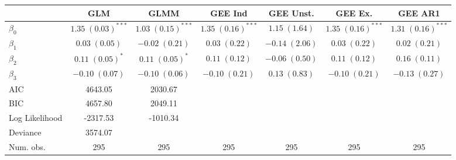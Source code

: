 \documentclass[11pt,letter]{article}\usepackage[]{graphicx}\usepackage[]{color}
\begin{document}
\begin{table}[H]
\begin{center}
\begin{scriptsize}
\begin{tabular}{l c c c c c c }
\hline
 & GLM & GLMM & GEE Ind & GEE Unst. & GEE Ex. & GEE AR1 \\
\hline
$\beta_0$                & $\mathbf{1.35} \; (0.03)^{***}$ & $\mathbf{1.03} \; (0.15)^{***}$ & $\mathbf{1.35} \; (0.16)^{***}$ & $1.15 \; (1.64)$  & $\mathbf{1.35} \; (0.16)^{***}$ & $\mathbf{1.31} \; (0.16)^{***}$ \\
$\beta_1$                & $0.03 \; (0.05)$                & $-0.02 \; (0.21)$               & $0.03 \; (0.22)$                & $-0.14 \; (2.06)$ & $0.03 \; (0.22)$                & $0.02 \; (0.21)$                \\
$\beta_2$                & $\mathbf{0.11} \; (0.05)^{*}$   & $\mathbf{0.11} \; (0.05)^{*}$   & $0.11 \; (0.12)$                & $-0.06 \; (0.50)$ & $0.11 \; (0.12)$                & $0.16 \; (0.11)$                \\
$\beta_3$                & $-0.10 \; (0.07)$               & $-0.10 \; (0.06)$               & $-0.10 \; (0.21)$               & $0.13 \; (0.83)$  & $-0.10 \; (0.21)$               & $-0.13 \; (0.27)$               \\
\hline
AIC                      & 4643.05                         & 2030.67                         &                                 &                   &                                 &                                 \\
BIC                      & 4657.80                         & 2049.11                         &                                 &                   &                                 &                                 \\
Log Likelihood           & -2317.53                        & -1010.34                        &                                 &                   &                                 &                                 \\
Deviance                 & 3574.07                         &                                 &                                 &                   &                                 &                                 \\
Num. obs.                & 295                             & 295                             & 295                             & 295               & 295                             & 295                             \\

\end{tabular}
\end{scriptsize}
\end{center}
\end{table}
\end{document}
